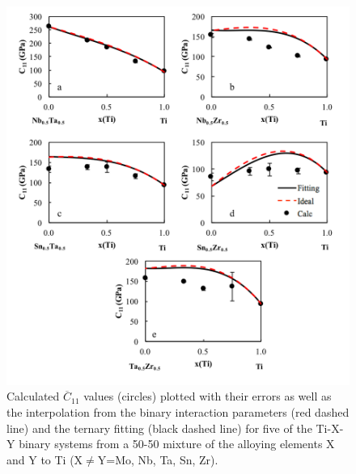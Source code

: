 \pagebreak
\begin{figure}[H]
	\centering
	\includegraphics[width=\textwidth]{Chapter-6/Figures/tixyc11_2.png}
	\caption{Calculated $\overline{C}_{11}$ values (circles) plotted with their errors as well as the interpolation from the binary interaction parameters (red dashed line) and the ternary fitting (black dashed line) for five of the Ti-X-Y binary systems from a 50-50 mixture of the alloying elements X and Y to Ti (X$\neq$Y=Mo, Nb, Ta, Sn, Zr).}
	\label{Ch6-figure:tixyc11_2}
\end{figure}


